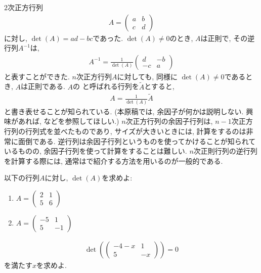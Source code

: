 \begin{remark}
  $2$次正方行列
  \begin{align*}
    A=\begin{pmatrix}a&b\\c&d\end{pmatrix}
  \end{align*}
  に対し, $\det(A)=ad-bc$であった.
  $\det(A)\neq 0$のとき, $A$は正則で,
  その逆行列$A^{-1}$は,
  \begin{align*}
    A^{-1}=\frac{1}{\det(A)}\begin{pmatrix}d&-b\\-c&a\end{pmatrix}
  \end{align*}
  と表すことができた.
  $n$次正方行列$A$に対しても,
  同様に
  $\det(A)\neq 0$であるとき, $A$は正則である.
  $A$の
  と呼ばれる行列を$\tilde A$とすると,
  \begin{align*}
    A = \frac{1}{\det(A)}\tilde A
  \end{align*}
  と書き表せることが知られている.
  (本原稿では, 余因子が何かは説明しない.
  興味があれば,
  \cite{978-4-7806-0772-7,978-4-7806-0164-0}などを参照してほしい.)
  $n$次正方行列の余因子行列は, $n-1$次正方行列の行列式を並べたものであり,
  サイズが大きいときには, 計算をするのは非常に面倒である.
  逆行列は余因子行列というものを使ってかけることが知られているものの,
  余因子行列を使って計算をすることは難しい.
  $n$次正則行列の逆行列を計算する際には,
  通常はで紹介する方法を用いるのが一般的である.
\end{remark}

\begin{quiz}
  \label{quiz:2:1}
  以下の行列$A$に対し, $\det(A)$を求めよ:
  \begin{enumerate}
  \item
    $A=\begin{pmatrix}2&1\\5&6\end{pmatrix}$
  \item
    $A=\begin{pmatrix}-5&1\\5&-1\end{pmatrix}$
  \end{enumerate}
\end{quiz}

\begin{quiz}
  \label{quiz:2:2}
  
  \begin{align*}
    \det(
    \begin{pmatrix}
      -4-x&1\\5&-x
    \end{pmatrix})=0
  \end{align*}
  を満たす$x$を求めよ.
\end{quiz}

